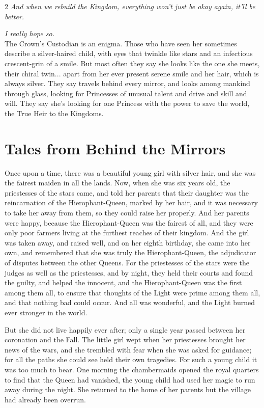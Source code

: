 \begin{multicols}{2}
\textit{And when we rebuild the Kingdom, everything won't just be okay again, it'll be better.}

\textit{I really hope so. }\\

\noindent The Crown's Custodian is an enigma. Those who have seen her sometimes describe a silver-haired child, with eyes that twinkle like stars and an infectious crescent-grin of a smile. But most often they say she looks like the one she meets, their chiral twin... apart from her ever present serene smile and her hair, which is always silver. They say travels behind every mirror, and looks among mankind through glass, looking for Princesses of unusual talent and drive and skill and will. They say she's looking for one Princess with the power to save the world, the True Heir to the Kingdoms. 

\section*{Tales from Behind the Mirrors}

Once upon a time, there was a beautiful young girl with silver hair, and she was the fairest maiden in all the lands. Now, when she was six years old, the priestesses of the stars came, and told her parents that their daughter was the reincarnation of the Hierophant-Queen, marked by her hair, and it was necessary to take her away from them, so they could raise her properly. And her parents were happy, because the Hierophant-Queen was the fairest of all, and they were only poor farmers living at the furthest reaches of their kingdom. And the girl was taken away, and raised well, and on her eighth birthday, she came into her own, and remembered that she was truly the Hierophant-Queen, the adjudicator of disputes between the other Queens. For the priestesses of the stars were the judges as well as the priestesses, and by night, they held their courts and found the guilty, and helped the innocent, and the Hierophant-Queen was the first among them all, to ensure that thoughts of the Light were prime among them 
all, 
and that nothing bad could occur. And all was wonderful, and the Light burned ever stronger in the world. 

But she did not live happily ever after; only a single year passed between her coronation and the Fall. The little girl wept when her priestesses brought her news of the wars, and she trembled with fear when she was asked for guidance; for all the paths she could see held their own tragedies. For such a young child it was too much to bear. One morning the chambermaids opened the royal quarters to find that the Queen had vanished, the young child had used her magic to run away during the night. She returned to the home of her parents but the village had already been overrun. 


\end{multicols}
